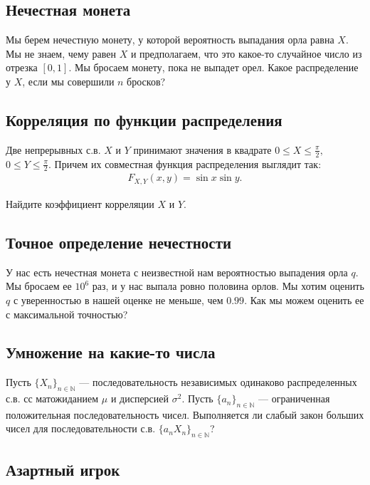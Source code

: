 \documentclass[12pt]{article}
\newcommand\N{\mathbb{N}}
\begin{document}
\subsection{Нечестная монета}

Мы берем нечестную монету, у которой вероятность выпадания орла равна $X$. Мы не знаем, чему равен $X$ и предполагаем, что это какое-то случайное число из отрезка $[0, 1]$. Мы бросаем монету, пока не выпадет орел. Какое распределение у $X$, если мы совершили $n$ бросков?



\subsection{Корреляция по функции распределения}

Две непрерывных с.в. $X$ и $Y$ принимают значения в квадрате $0 \le X \le \frac{\pi}{2},$ $0 \le Y \le \frac{\pi}{2}$. Причем их совместная функция распределения выглядит так:
\begin{align*}
    F_{X, Y} (x, y) = \sin x \sin y.
\end{align*}

Найдите коэффициент корреляции $X$ и $Y$.



\subsection{Точное определение нечестности}

У нас есть нечестная монета с неизвестной нам вероятностью выпадения орла $q$. Мы бросаем ее $10^6$ раз, и у нас выпала ровно половина орлов. Мы хотим оценить $q$ с уверенностью в нашей оценке не меньше, чем $0.99$. Как мы можем оценить ее с максимальной точностью? 



\subsection{Умножение на какие-то числа}

Пусть $\{X_n\}_{n \in \N}$ --- последовательность независимых одинаково распределенных с.в. сс матожиданием $\mu$ и дисперсией $\sigma^2$. Пусть $\{a_n\}_{n \in \N}$ --- ограниченная положительная последовательность чисел. Выполняется ли слабый закон больших чисел для последовательности с.в. $\{a_n X_n\}_{n \in \N}$?



\subsection{Азартный игрок}
\end{document}

